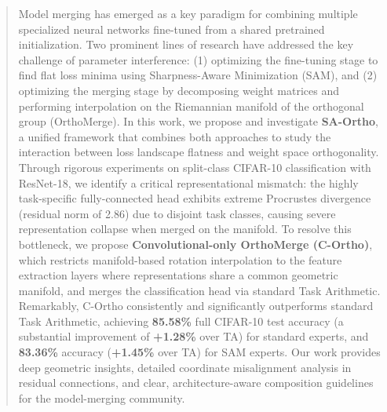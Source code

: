 \documentclass{article}
\begin{document}

\printAffiliationsAndNotice{}

\begin{abstract}
Model merging has emerged as a key paradigm for combining multiple specialized neural networks fine-tuned from a shared pretrained initialization. 
Two prominent lines of research have addressed the key challenge of parameter interference: 
(1) optimizing the fine-tuning stage to find flat loss minima using Sharpness-Aware Minimization (SAM), and 
(2) optimizing the merging stage by decomposing weight matrices and performing interpolation on the Riemannian manifold of the orthogonal group (OrthoMerge). 
In this work, we propose and investigate \textbf{SA-Ortho}, a unified framework that combines both approaches to study the interaction between loss landscape flatness and weight space orthogonality. 
Through rigorous experiments on split-class CIFAR-10 classification with ResNet-18, we identify a critical representational mismatch: the highly task-specific fully-connected head exhibits extreme Procrustes divergence (residual norm of 2.86) due to disjoint task classes, causing severe representation collapse when merged on the manifold.
To resolve this bottleneck, we propose \textbf{Convolutional-only OrthoMerge (C-Ortho)}, which restricts manifold-based rotation interpolation to the feature extraction layers where representations share a common geometric manifold, and merges the classification head via standard Task Arithmetic.
Remarkably, C-Ortho consistently and significantly outperforms standard Task Arithmetic, achieving \textbf{85.58\%} full CIFAR-10 test accuracy (a substantial improvement of \textbf{+1.28\%} over TA) for standard experts, and \textbf{83.36\%} accuracy (\textbf{+1.45\%} over TA) for SAM experts.
Our work provides deep geometric insights, detailed coordinate misalignment analysis in residual connections, and clear, architecture-aware composition guidelines for the model-merging community.
\end{abstract}
\end{document}
